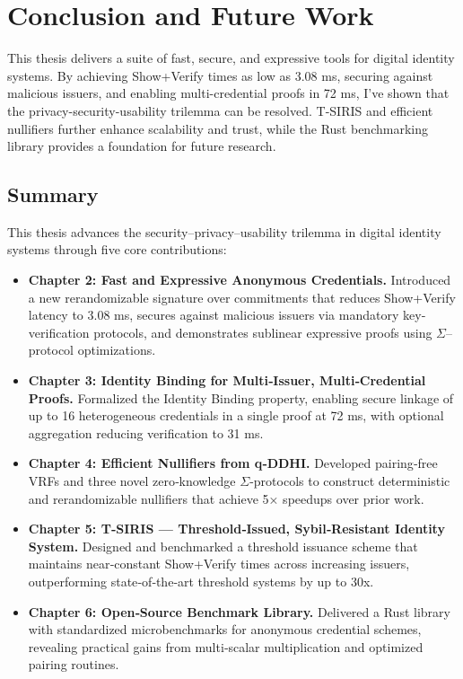 \chapter{Conclusion and Future Work}\label{chap7}
This thesis delivers a suite of fast, secure, and expressive tools for digital identity systems. By achieving Show+Verify times as low as 3.08 ms, securing against malicious issuers, and enabling multi-credential proofs in 72 ms, I’ve shown that the privacy-security-usability trilemma can be resolved. T-SIRIS and efficient nullifiers further enhance scalability and trust, while the Rust benchmarking library provides a foundation for future research.

\section{Summary}
This thesis advances the security–privacy–usability trilemma in digital identity systems through five core contributions:

\begin{itemize}
  \item \textbf{Chapter 2: Fast and Expressive Anonymous Credentials.} Introduced a new rerandomizable signature over commitments that reduces Show+Verify latency to 3.08 ms, secures against malicious issuers via mandatory key‐verification protocols, and demonstrates sublinear expressive proofs using $\Sigma$–protocol optimizations.
  
  \item \textbf{Chapter 3: Identity Binding for Multi‐Issuer, Multi‐Credential Proofs.} Formalized the Identity Binding property, enabling secure linkage of up to 16 heterogeneous credentials in a single proof at 72 ms, with optional aggregation reducing verification to 31 ms.
  
  \item \textbf{Chapter 4: Efficient Nullifiers from q‐DDHI.} Developed pairing‐free VRFs and three novel zero‐knowledge $\Sigma$-protocols to construct deterministic and rerandomizable nullifiers that achieve 5× speedups over prior work.
  
  \item \textbf{Chapter 5: T‐SIRIS — Threshold‐Issued, Sybil‐Resistant Identity System.} Designed and benchmarked a threshold issuance scheme that maintains near‐constant Show+Verify times across increasing issuers, outperforming state‐of‐the‐art threshold systems by up to 30x.
  
  \item \textbf{Chapter 6: Open‐Source Benchmark Library.} Delivered a Rust library with standardized microbenchmarks for anonymous credential schemes, revealing practical gains from multi‐scalar multiplication and optimized pairing routines.
\end{itemize}

